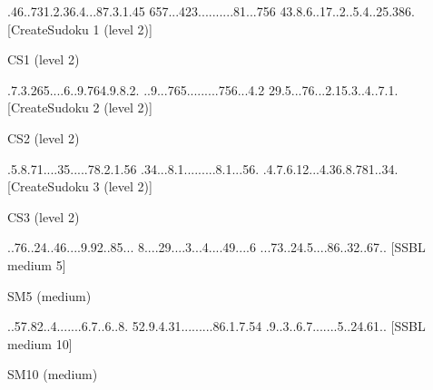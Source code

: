 \documentclass[twoside]{article}
\begin{document}
\renewcommand*{\puzzlefile}{cs1.sud}
\writepuzzle%
{.46..731.}{2.36.4...}{87.3.1.45}%
{657...423}{.........}{.81...756}%
{43.8.6..1}{7..2..5.4}{..25.386.}%
[CreateSudoku 1 (level 2)]
\vfill
\begin{minipage}{0.95\linewidth}\begin{center}
CS1 (level 2) \\
\end{center}\end{minipage}

\renewcommand*{\puzzlefile}{cs2.sud}
\writepuzzle%
{.7.3.265.}{...6..9.7}{64.9.8.2.}%
{..9...765}{.........}{756...4.2}%
{29.5...76}{...2.15.3}{..4..7.1.}%
[CreateSudoku 2 (level 2)]
\vfill
\begin{minipage}{0.95\linewidth}\begin{center}
CS2 (level 2) \\
\end{center}\end{minipage}

\renewcommand*{\puzzlefile}{cs3.sud}
\writepuzzle%
{.5.8.71..}{..35.....}{78.2.1.56}%
{.34...8.1}{.........}{8.1...56.}%
{.4.7.6.12}{...4.36.8}{.781..34.}%
[CreateSudoku 3 (level 2)]
\vfill
\begin{minipage}{0.95\linewidth}\begin{center}
CS3 (level 2) \\
\end{center}\end{minipage}


\clearpage
{}

\renewcommand*{\puzzlefile}{sm5.sud}
\writepuzzle%
{..76..24.}{.46....9.}{92..85...}%
{8....29..}{..3...4..}{..49....6}%
{...73..24}{.5....86.}{.32..67..}%
[SSBL medium 5]
\vfill
\begin{minipage}{0.95\linewidth}\begin{center}
SM5 (medium) \\
\end{center}\end{minipage}

\renewcommand*{\puzzlefile}{sm10.sud}
\writepuzzle%
{..57.82..}{4.......6}{.7..6..8.}%
{52.9.4.31}{.........}{86.1.7.54}%
{.9..3..6.}{7.......5}{..24.61..}%
[SSBL medium 10]
\vfill
\begin{minipage}{0.95\linewidth}\begin{center}
SM10 (medium) \\
\end{center}\end{minipage}
\end{document}
